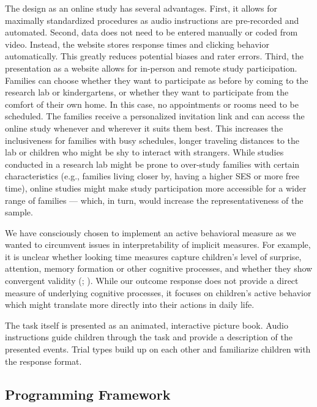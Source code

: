 \documentclass[
]{scrbook}
\begin{document}
The design as an online study has several advantages. First, it allows for maximally standardized procedures as audio instructions are pre-recorded and automated. Second, data does not need to be entered manually or coded from video. Instead, the website stores response times and clicking behavior automatically. This greatly reduces potential biases and rater errors. Third, the presentation as a website allows for in-person and remote study participation. Families can choose whether they want to participate as before by coming to the research lab or kindergartens, or whether they want to participate from the comfort of their own home. In this case, no appointments or rooms need to be scheduled. The families receive a personalized invitation link and can access the online study whenever and wherever it suits them best. This increases the inclusiveness for families with busy schedules, longer traveling distances to the lab or children who might be shy to interact with strangers. While studies conducted in a research lab might be prone to over-study families with certain characteristics (e.g., families living closer by, having a higher SES or more free time), online studies might make study participation more accessible for a wider range of families --- which, in turn, would increase the representativeness of the sample.

We have consciously chosen to implement an active behavioral measure as we wanted to circumvent issues in interpretability of implicit measures. For example, it is unclear whether looking time measures capture children's level of surprise, attention, memory formation or other cognitive processes, and whether they show convergent validity (; ). While our outcome response does not provide a direct measure of underlying cognitive processes, it focuses on children's active behavior which might translate more directly into their actions in daily life.

The task itself is presented as an animated, interactive picture book. Audio instructions guide children through the task and provide a description of the presented events. Trial types build up on each other and familiarize children with the response format.

\subsection{Programming Framework}\label{programming-framework}
\end{document}
